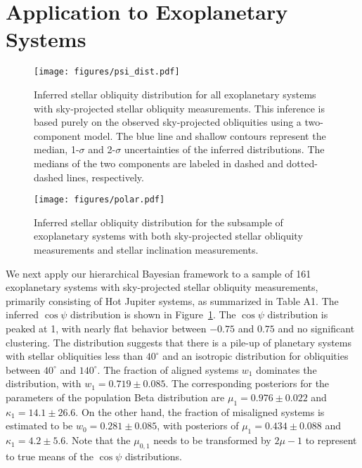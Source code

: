 \documentclass[twocolumn,times]{aastex631}
\begin{document}
\section{Application to Exoplanetary Systems}\label{sec:observation}

\begin{figure}[ht!]
    \begin{centering}
        \texttt{[image: figures/psi\_dist.pdf]}
        \caption{Inferred stellar obliquity distribution for all exoplanetary systems with sky-projected stellar obliquity measurements. This inference is based purely on the observed sky-projected obliquities using a two-component model. The blue line and shallow contours represent the median, 1-$\sigma$ and 2-$\sigma$ uncertainties of the inferred distributions. The medians of the two components are labeled in dashed and dotted-dashed lines, respectively.}
        \label{fig:psi_dist}
    \end{centering}
\end{figure}

\begin{figure*}[ht!]
    \begin{centering}
        \texttt{[image: figures/polar.pdf]}
        \caption{Inferred stellar obliquity distribution for the subsample of exoplanetary systems with both sky-projected stellar obliquity measurements and stellar inclination measurements.}
        \label{fig:polar}
    \end{centering}
\end{figure*}

We next apply our hierarchical Bayesian framework to a sample of 161 exoplanetary systems with sky-projected stellar obliquity measurements, primarily consisting of Hot Jupiter systems, as summarized in \cite{Albrecht22} Table A1.
The inferred $\cos{\psi}$ distribution is shown in Figure~\ref{fig:psi_dist}. The $\cos{\psi}$ distribution is peaked at 1, with nearly flat behavior between $-0.75$ and $0.75$ and no significant clustering. The distribution suggests that there is a pile-up of planetary systems with stellar obliquities less than $40^\circ$ and an isotropic distribution for obliquities between $40^\circ$ and $140^\circ$.
The fraction of aligned systems $w_1$ dominates the distribution, with $w_1 = 0.719 \pm 0.085$. The corresponding posteriors for the parameters of the population Beta distribution are $\mu_1 = 0.976 \pm 0.022$ and $\kappa_1 = 14.1 \pm 26.6$. On the other hand, the fraction of misaligned systems is estimated to be $w_0 = 0.281 \pm 0.085$, with posteriors of $\mu_1 = 0.434 \pm 0.088$ and $\kappa_1 = 4.2 \pm 5.6$. Note that the $\mu_{0,1}$ needs to be transformed by $2\mu-1$ to represent to true means of the $\cos{\psi}$ distributions.
\end{document}
